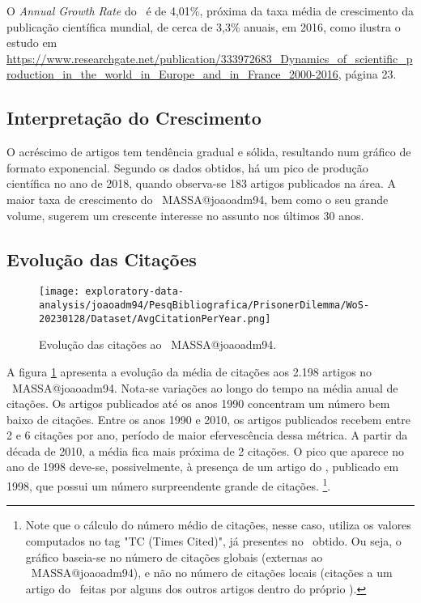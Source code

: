 O \textit{Annual Growth Rate} do \dataset\   é de 4,01\%, próxima da taxa média de crescimento da publicação científica mundial, de cerca de 3,3\% anuais, em 2016, como ilustra o estudo em \url{https://www.researchgate.net/publication/333972683_Dynamics_of_scientific_production_in_the_world_in_Europe_and_in_France_2000-2016}, página 23.

\subsection{Interpretação do Crescimento} O acréscimo de artigos tem tendência gradual e sólida, resultando num gráfico de formato exponencial. Segundo os dados obtidos, há um pico de produção científica no ano de 2018, quando observa-se 183 artigos publicados na área. A maior taxa de crescimento do \dataset\ MASSA@joaoadm94, bem como o seu grande volume, sugerem um crescente interesse no assunto nos últimos 30 anos. 

\subsection{Evolução das Citações}

\begin{figure}
    \centering
    \texttt{[image: exploratory-data-analysis/joaoadm94/PesqBibliografica/PrisonerDilemma/WoS-20230128/Dataset/AvgCitationPerYear.png]}
    \caption{Evolução das citações ao \dataset\   MASSA@joaoadm94.}
    \label{fig:evol:anual:citacoes:MASSA@joaoadm94}
\end{figure}

A figura \ref{fig:evol:anual:citacoes:MASSA@joaoadm94} apresenta a evolução da média de citações aos 2.198 artigos no \dataset\   MASSA@joaoadm94. 
Nota-se variações ao longo do tempo na média anual de citações. Os artigos publicados até os anos 1990 concentram um número bem baixo de citações. Entre os anos 1990 e 2010, os artigos publicados recebem entre 2 e 6 citações por ano, período de maior efervescência dessa métrica. A partir da década de 2010, a média fica mais próxima de 2 citações. O pico que aparece no ano de 1998 deve-se, possivelmente, à presença de um artigo do \dataset, publicado em 1998, que possui um número surpreendente grande de citações. \footnote{Note que o cálculo do número  médio de citações, nesse caso, utiliza os valores computados no tag "TC (Times Cited)", já presentes no \dataset\   obtido. Ou seja, o gráfico baseia-se no número de citações globais (externas ao \dataset\   MASSA@joaoadm94), e não no número de citações locais (citações a um artigo do \dataset\ feitas por alguns dos outros artigos dentro do próprio \dataset).}.

